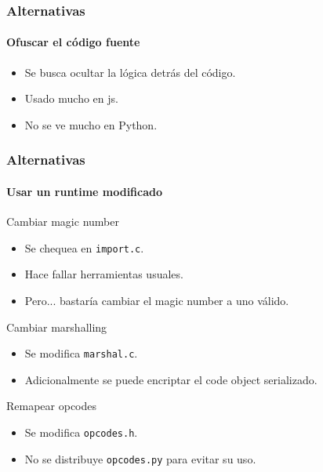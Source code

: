 \documentclass[9pt, notes=hide]{beamer}
\begin{document}
    \begin{frame}
        \frametitle{Alternativas}
        \framesubtitle{Ofuscar el código fuente}

        \begin{itemize}
            \item Se busca ocultar la lógica detrás del código.
            \item Usado mucho en js.
            \item No se ve mucho en Python.
        \end{itemize}
    \end{frame}

    \begin{frame}
        \frametitle{Alternativas}
        \framesubtitle{Usar un runtime modificado}

        \begin{beamerboxesrounded}[shadow=true]{Cambiar magic number}
            \begin{itemize}
                \item Se chequea en \texttt{import.c}.
                \item Hace fallar herramientas usuales.
                \item Pero... bastaría cambiar el magic number a uno válido.
            \end{itemize}
        \end{beamerboxesrounded}
        \vspace{0.5cm}
        \begin{beamerboxesrounded}[shadow=true]{Cambiar marshalling}
            \begin{itemize}
                \item Se modifica \texttt{marshal.c}.
                \item Adicionalmente se puede encriptar el code object serializado.
            \end{itemize}
        \end{beamerboxesrounded}
        \vspace{0.5cm}
        \begin{beamerboxesrounded}[shadow=true]{Remapear opcodes}
            \begin{itemize}
                \item Se modifica \texttt{opcodes.h}.
                \item No se distribuye \texttt{opcodes.py} para evitar su uso.
            \end{itemize}
        \end{beamerboxesrounded}

    \end{frame}
\end{document}
